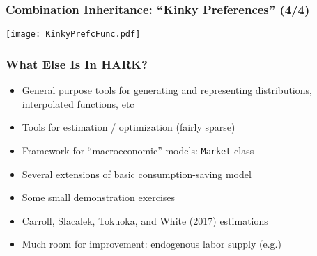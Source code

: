 \documentclass[11ptt]{beamer}
\begin{document}
\begin{frame}
\frametitle{Combination Inheritance: ``Kinky Preferences'' (4/4)}
\hyperlink{DiscussionTopics}{}

\begin{center}
\texttt{[image: KinkyPrefcFunc.pdf]}
\end{center}

\end{frame}





\begin{frame}
\frametitle{What Else Is In HARK?}

\begin{itemize}
\item <1->General purpose tools for generating and representing distributions, interpolated functions, etc

\item <1->Tools for estimation / optimization (fairly sparse)

\item <2->Framework for ``macroeconomic'' models: \texttt{Market} class

\item <3->Several extensions of basic consumption-saving model

\item <4->Some small demonstration exercises

\item <4->Carroll, Slacalek, Tokuoka, and White (2017) estimations

\item <5->Much room for improvement: endogenous labor supply (e.g.)

\end{itemize}

\end{frame}
\end{document}
